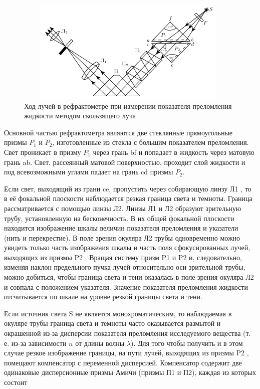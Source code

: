 \documentclass[12pt]{article}
\begin{document}
	\begin{figure}[h!]
		\centering
		\includegraphics[width = 11cm, height = 5cm]{image1.png}
		\caption{Ход лучей в рефрактометре при измерении показателя преломления жидкости методом скользящего луча}
	\end{figure}
\par
	Основной частью рефрактометра являются две стеклянные прямоугольные призмы $P_1$ и $P_2$, изготовленные из стекла с большим показателем преломления. Свет проникает в призму $P_1$ через грань bf и попадает в жидкость через матовую грань ab. Свет, рассеянный матовой поверхностью, проходит слой жидкости и под всевозможными углами падает на
грань cd призмы $P_2$.
\par
	Если свет, выходящий из грани ce, пропустить через собирающую линзу Л1 , то в её фокальной плоскости наблюдается резкая граница света и темноты. Граница рассматривается с помощью линзы Л2. Линзы Л1 и Л2 образуют зрительную трубу, установленную на бесконечность.
В их общей фокальной плоскости находится изображение шкалы величин показателя преломления и указатели (нить и перекрестие). В поле зрения окуляра Л2 трубы одновременно можно увидеть только часть изображения шкалы и часть поля сфокусированных лучей, выходящих из призмы P2 . Вращая систему призм P1 и P2 и, следовательно, изменяя наклон предельного пучка лучей относительно оси зрительной трубы, можно добиться, чтобы граница света и тени оказалась в поле зрения окуляра Л2 и совпала с положением указателя. Значение показателя преломления жидкости отсчитывается по шкале на уровне резкой границы света и тени.
\par
	Если источник света S не является монохроматическим, то наблюдаемая в окуляре трубы граница света и темноты часто оказывается размытой и окрашенной из-за дисперсии показателя преломления исследуемого вещества (т. е. из-за зависимости $n$ от длины волны $\lambda$). Для
того чтобы получить и в этом случае резкое изображение границы, на пути лучей, выходящих из призмы P2 , помещают компенсатор с переменной дисперсией. Компенсатор содержит две одинаковые дисперсионные призмы Амичи (призмы П1 и П2), каждая из которых состоит
\end{document}
